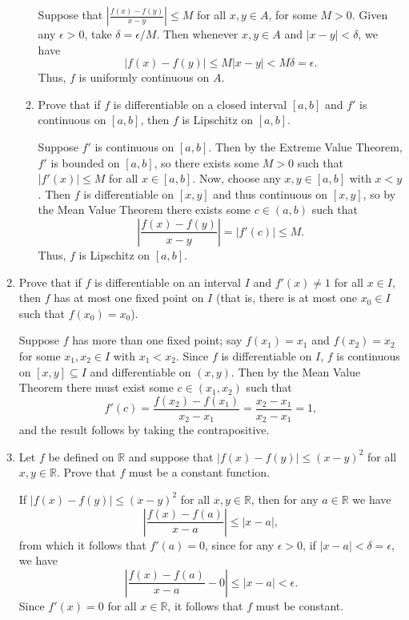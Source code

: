 \documentclass[letterpaper,12pt]{article}
\newcommand{\R}{\mathbb{R}}
\newcommand{\abs}[1]{\lvert #1\rvert}
\newcommand{\Abs}[1]{\left| #1\right|}
\begin{document}
\begin{enumerate}
\begin{enumerate}
 \bigskip
 
 Suppose that $\displaystyle \Abs{\frac{f(x)-f(y)}{x-y}}\leq M$ for all $x,y\in A$, for some $M>0$. Given any $\epsilon>0$, take $\delta = \epsilon/M$. Then whenever $x,y\in A$ and $\abs{x-y}<\delta$, we have
 \[
 \abs{f(x)-f(y)}\leq M\abs{x-y} <M\delta = \epsilon.
 \]
 Thus, $f$ is uniformly continuous on $A$.
 
 \bigskip
 
 \item Prove that if $f$ is differentiable on a closed interval $[a,b]$ and $f'$ is continuous on $[a,b]$, then $f$ is Lipschitz on $[a,b]$.
 
 \bigskip
 
 Suppose $f'$ is continuous on $[a,b]$. Then by the Extreme Value Theorem, $f'$ is bounded on $[a,b]$, so there exists some $M>0$ such that $\abs{f'(x)}\leq M$ for all $x\in [a,b]$. Now, choose any $x,y\in [a,b]$ with $x<y$. Then $f$ is differentiable on $[x,y]$ and thus continuous on $[x,y]$, so by the Mean Value Theorem there exists some $c\in (a,b)$ such that
 \[
 \Abs{\frac{f(x)-f(y)}{x-y}} = \abs{f'(c)}\leq M.
 \]
 Thus, $f$ is Lipschitz on $[a,b]$.
  
 \bigskip
 
\end{enumerate}
 \item Prove that if $f$ is differentiable on an interval $I$ and $f'(x)\neq 1$ for all $x\in I$, then $f$ has at most one fixed point on $I$ (that is, there is at most one $x_0\in I$ such that $f(x_0)=x_0$).
 
 \bigskip
 
Suppose $f$ has more than one fixed point; say $f(x_1)=x_1$ and $f(x_2)=x_2$ for some $x_1,x_2\in I$ with $x_1<x_2$. Since $f$ is differentiable on $I$, $f$ is continuous on $[x,y]\subseteq I$ and differentiable on $(x,y)$. Then by the Mean Value Theorem there must exist some $c\in (x_1,x_2)$ such that
\[
f'(c) = \frac{f(x_2)-f(x_1)}{x_2-x_1} = \frac{x_2-x_1}{x_2-x_1} = 1,
\]
and the result follows by taking the contrapositive.

\bigskip

 \item Let $f$ be defined on $\R$ and suppose that $\abs{f(x)-f(y)}\leq (x-y)^2$ for all $x,y\in\R$. Prove that $f$ must be a constant function.
 
 \bigskip
 
 If $\abs{f(x)-f(y)}\leq (x-y)^2$ for all $x,y\in\R$, then for any $a\in \R$ we have
 \[
 \Abs{\frac{f(x)-f(a)}{x-a}}\leq \abs{x-a},
 \]
 from which it follows that $f'(a)=0$, since for any $\epsilon>0$, if $\abs{x-a}<\delta=\epsilon$, we have
 \[
 \Abs{\frac{f(x)-f(a)}{x-a} - 0} \leq \abs{x-a} <\epsilon.
 \]
 Since $f'(x)=0$ for all $x\in \R$, it follows that $f$ must be constant.
 

\end{enumerate}
\end{document}
